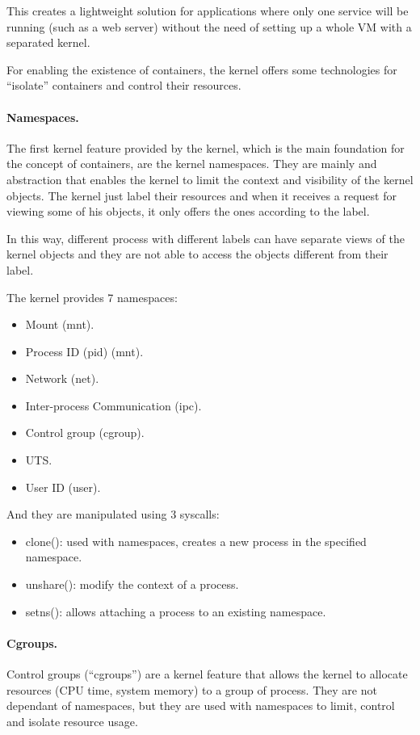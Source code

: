 This creates a lightweight solution for applications where only one service will be running (such as a web server) without the need of setting up a whole VM with a separated kernel.

For enabling the existence of containers, the kernel offers some technologies for ``isolate'' containers and control their resources.

\paragraph{Namespaces.} The first kernel feature provided by the kernel, which is the main foundation for the concept of containers, are the kernel namespaces.
They are mainly and abstraction that enables the kernel to limit the context and visibility of the kernel objects. The kernel just label their resources and when it receives a request for viewing some of his objects, it only offers the ones according to the label.

In this way, different process with different labels can have separate views of the kernel objects and they are not able to access the objects different from their label.

The kernel provides 7 namespaces:
\begin{itemize}
	\item{Mount (mnt).}
	\item{Process ID (pid) (mnt).}
	\item{Network (net).}
	\item{Inter-process Communication (ipc).}
	\item{Control group (cgroup).}
	\item{UTS.}
	\item{User ID (user).}
\end{itemize}

And they are manipulated using 3 syscalls:
\begin{itemize}
	\item{clone(): used with namespaces, creates a new process in the specified namespace.}
	\item{unshare(): modify the context of a process.}
	\item{setns(): allows attaching a process to an existing namespace.}
\end{itemize}

\paragraph{Cgroups.} Control groups (``cgroups'') are a kernel feature that allows the kernel to allocate resources (CPU time, system memory) to a group of process. They are not dependant of namespaces, but they are used with namespaces to limit, control and isolate resource usage.

